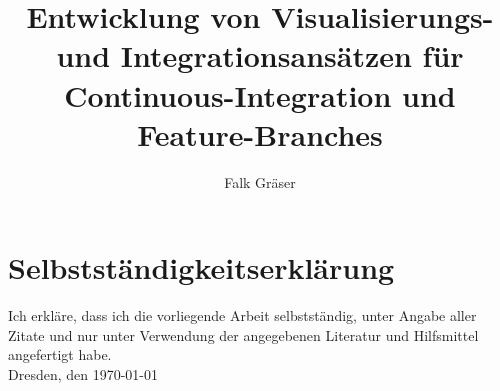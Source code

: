\documentclass[12pt,a4paper]{book}
\author{Falk Gräser}
\title{Entwicklung von Visualisierungs- und Integrationsansätzen für Continuous-Integration und Feature-Branches}
\begin{document}
\frontmatter

\maketitle

\tableofcontents
\listoffigures
\printglossary

\mainmatter








\appendix
\printbibliography[heading=bibnumbered]
\chapter{Selbstständigkeitserklärung}
Ich erkläre, dass ich die vorliegende Arbeit selbstständig, unter Angabe aller Zitate und nur unter Verwendung der angegebenen Literatur und Hilfsmittel angefertigt habe.
\vspace{5em}
\\
Dresden, den \today
\end{document}
